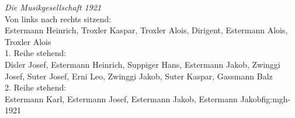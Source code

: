\begin{figure}[ht]
    \hfil {}
\end{figure}

\clearpage

{ \emph{Die Musikgesellschaft 1921}\\
    Von links nach rechts sitzend:\\
    Estermann Heinrich, Troxler Kaspar, Troxler Alois, Dirigent, Estermann
    Alois, Troxler Alois\\
    1. Reihe stehend:\\
    Disler Josef, Estermann Heinrich, Suppiger Hans, Estermann Jakob, Zwinggi
    Josef, Suter Josef, Erni Leo, Zwinggi Jakob, Suter Kaspar, Gassmann Balz\\
    2. Reihe stehend:\\
    Estermann Karl, Estermann Josef, Estermann Jakob, Estermann
    Jakob}{fig:mgh-1921}


